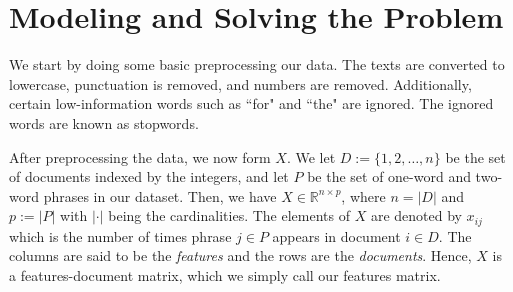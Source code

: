 \documentclass{article}
\begin{document}
\section{Modeling and Solving the Problem} \label{sec:setup}
We start by doing some basic preprocessing our data. The texts are converted to lowercase, punctuation is removed, and numbers are removed. Additionally, certain low-information words such as ``for" and ``the" are ignored. The ignored words are known as stopwords.

After preprocessing the data, we now form $X$. We let $D:=\{1, 2, \ldots, n\}$ be the set of documents indexed by the integers, and let $P$ be the set of one-word and two-word phrases in our dataset. Then, we have $X \in \mathbb{R}^{n \times p}$, where $n=|D|$ and $p:=|P|$ with $|\cdot|$ being the cardinalities. The elements of $X$ are denoted by $x_{ij}$ which is the number of times phrase $j \in P$ appears in document $i \in D$. The columns are said to be the \emph{features} and the rows are the \emph{documents}. Hence, $X$ is a features-document matrix, which we simply call our features matrix.
\end{document}
